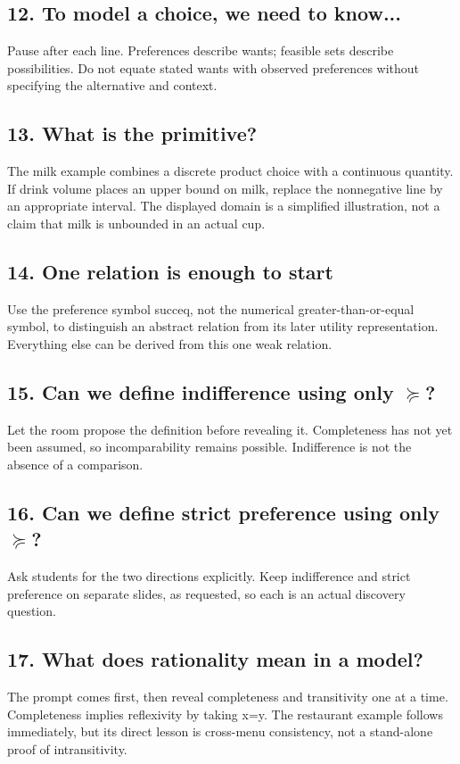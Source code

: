 \documentclass[11pt,a4paper]{article}
\begin{document}
\subsection*{12. To model a choice, we need to know...}
Pause after each line. Preferences describe wants; feasible sets describe possibilities. Do not equate stated wants with observed preferences without specifying the alternative and context.

\subsection*{13. What is the primitive?}
The milk example combines a discrete product choice with a continuous quantity. If drink volume places an upper bound on milk, replace the nonnegative line by an appropriate interval. The displayed domain is a simplified illustration, not a claim that milk is unbounded in an actual cup.

\subsection*{14. One relation is enough to start}
Use the preference symbol succeq, not the numerical greater-than-or-equal symbol, to distinguish an abstract relation from its later utility representation. Everything else can be derived from this one weak relation.

\subsection*{15. Can we define indifference using only $\succeq$?}
Let the room propose the definition before revealing it. Completeness has not yet been assumed, so incomparability remains possible. Indifference is not the absence of a comparison.

\subsection*{16. Can we define strict preference using only $\succeq$?}
Ask students for the two directions explicitly. Keep indifference and strict preference on separate slides, as requested, so each is an actual discovery question.

\subsection*{17. What does rationality mean in a model?}
The prompt comes first, then reveal completeness and transitivity one at a time. Completeness implies reflexivity by taking x=y. The restaurant example follows immediately, but its direct lesson is cross-menu consistency, not a stand-alone proof of intransitivity.
\end{document}
